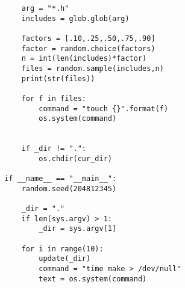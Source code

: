 \begin{apendicesenv}
\begin{lstlisting}
    arg = "*.h"
    includes = glob.glob(arg)

    factors = [.10,.25,.50,.75,.90]
    factor = random.choice(factors)
    n = int(len(includes)*factor)
    files = random.sample(includes,n)
    print(str(files))

    for f in files:
        command = "touch {}".format(f)
        os.system(command)


    if _dir != ".":
        os.chdir(cur_dir)

if __name__ == "__main__":
    random.seed(204812345)

    _dir = "."
    if len(sys.argv) > 1:
        _dir = sys.argv[1]
    
    for i in range(10):
        update(_dir)
        command = "time make > /dev/null"
        text = os.system(command)
\end{lstlisting}
\end{apendicesenv}
